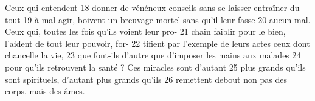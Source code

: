Ceux qui entendent	 
18	 	donner de vénéneux conseils sans se laisser entraîner du tout	 
19	 	à mal agir, boivent un breuvage mortel sans qu'il leur fasse	 
20	 	aucun mal. Ceux qui, toutes les fois qu'ils voient leur pro-	 
21	 	chain faiblir pour le bien, l'aident de tout leur pouvoir, for-	 
22	 	tifient par l'exemple de leurs actes ceux dont chancelle la vie,	 
23	 	que font-ils d'autre que d'imposer les mains aux malades	 
24	 	pour qu'ils retrouvent la santé ? Ces miracles sont d'autant	 
25	 	plus grands qu'ils sont spirituels, d'autant plus grands qu'ils	 
26	 	remettent debout non pas des corps, mais des âmes.